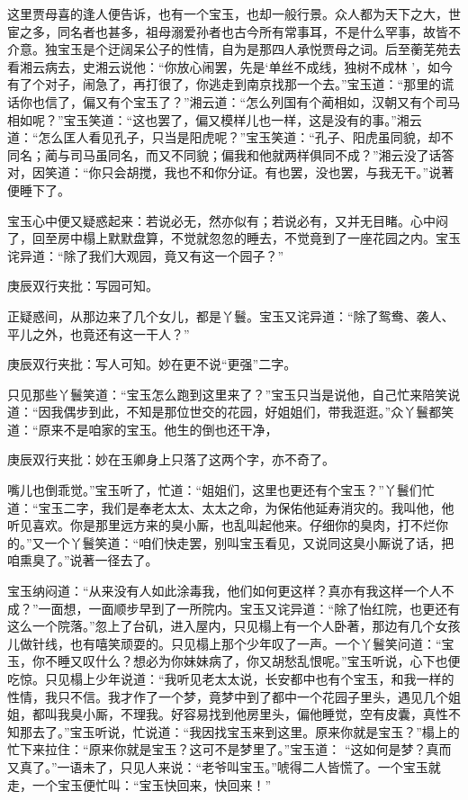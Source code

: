 \begin{parag}


    这里贾母喜的逢人便告诉，也有一个宝玉，也却一般行景。众人都为天下之大，世宦之多，同名者也甚多，祖母溺爱孙者也古今所有常事耳，不是什么罕事，故皆不介意。独宝玉是个迂阔呆公子的性情，自为是那四人承悦贾母之词。后至蘅芜苑去看湘云病去，史湘云说他：“你放心闹罢，先是‘单丝不成线，独树不成林 ’，如今有了个对子，闹急了，再打很了，你逃走到南京找那一个去。”宝玉道：“那里的谎话你也信了，偏又有个宝玉了？”湘云道：“怎么列国有个蔺相如，汉朝又有个司马相如呢？”宝玉笑道：“这也罢了，偏又模样儿也一样，这是没有的事。”湘云道：“怎么匡人看见孔子，只当是阳虎呢？”宝玉笑道：“孔子、阳虎虽同貌，却不同名；蔺与司马虽同名，而又不同貌；偏我和他就两样俱同不成？”湘云没了话答对，因笑道：“你只会胡搅，我也不和你分证。有也罢，没也罢，与我无干。”说著便睡下了。
\end{parag}


\begin{parag}


    宝玉心中便又疑惑起来：若说必无，然亦似有；若说必有，又并无目睹。心中闷了，回至房中榻上默默盘算，不觉就忽忽的睡去，不觉竟到了一座花园之内。宝玉诧异道：“除了我们大观园，竟又有这一个园子？”\begin{note}庚辰双行夹批：写园可知。\end{note}正疑惑间，从那边来了几个女儿，都是丫鬟。宝玉又诧异道：“除了鸳鸯、袭人、平儿之外，也竟还有这一干人？”\begin{note}庚辰双行夹批：写人可知。妙在更不说“更强”二字。\end{note}只见那些丫鬟笑道：“宝玉怎么跑到这里来了？”宝玉只当是说他，自己忙来陪笑说道：“因我偶步到此，不知是那位世交的花园，好姐姐们，带我逛逛。”众丫鬟都笑道：“原来不是咱家的宝玉。他生的倒也还干净，\begin{note}庚辰双行夹批：妙在玉卿身上只落了这两个字，亦不奇了。\end{note}嘴儿也倒乖觉。”宝玉听了，忙道：“姐姐们，这里也更还有个宝玉？”丫鬟们忙道：“宝玉二字，我们是奉老太太、太太之命，为保佑他延寿消灾的。我叫他，他听见喜欢。你是那里远方来的臭小厮，也乱叫起他来。仔细你的臭肉，打不烂你的。”又一个丫鬟笑道：“咱们快走罢，别叫宝玉看见，又说同这臭小厮说了话，把咱熏臭了。”说著一径去了。
\end{parag}


\begin{parag}


    宝玉纳闷道：“从来没有人如此涂毒我，他们如何更这样？真亦有我这样一个人不成？”一面想，一面顺步早到了一所院内。宝玉又诧异道：“除了怡红院，也更还有这么一个院落。”忽上了台矶，进入屋内，只见榻上有一个人卧著，那边有几个女孩儿做针线，也有嘻笑顽耍的。只见榻上那个少年叹了一声。一个丫鬟笑问道：“宝玉，你不睡又叹什么？想必为你妹妹病了，你又胡愁乱恨呢。”宝玉听说，心下也便吃惊。只见榻上少年说道：“我听见老太太说，长安都中也有个宝玉，和我一样的性情，我只不信。我才作了一个梦，竟梦中到了都中一个花园子里头，遇见几个姐姐，都叫我臭小厮，不理我。好容易找到他房里头，偏他睡觉，空有皮囊，真性不知那去了。”宝玉听说，忙说道：“我因找宝玉来到这里。原来你就是宝玉？”榻上的忙下来拉住：“原来你就是宝玉？这可不是梦里了。”宝玉道： “这如何是梦？真而又真了。”一语未了，只见人来说：“老爷叫宝玉。”唬得二人皆慌了。一个宝玉就走，一个宝玉便忙叫：“宝玉快回来，快回来！”
\end{parag}


